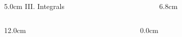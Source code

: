 \begin{frame}

\begin{columns}
\begin{column}{5.0cm}
	III. Integrals
\end{column}
\begin{column}{6.8cm}	\end{column}
\end{columns}


\scriptsize
\begin{columns}
\begin{column}{12.0cm}
	
\end{column}
\begin{column}{0.0cm}\end{column}
\end{columns}

\vspace{10.2cm}

\end{frame}